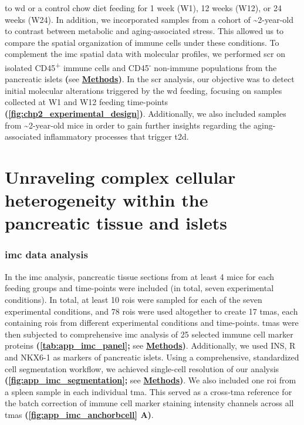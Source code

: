  to \gls{wd} or a control chow diet feeding for 1 week (W1), 12 weeks (W12), or 24 weeks (W24). In addition, we incorporated samples from a cohort of \textasciitilde2-year-old to contrast between metabolic and aging-associated stress. This allowed us to compare the spatial organization of immune cells under these conditions. To complement the \gls{imc} spatial data with molecular profiles, we performed \gls{scr} on isolated CD45\textsuperscript{+} immune cells and CD45\textsuperscript{-} non-immune populations from the pancreatic islets \textbf{(}see \hyperref[subsec:met_chp2_scrdata]{\textbf{Methods}}\textbf{)}. In the \gls{scr} analysis, our objective was to detect initial molecular alterations triggered by the \gls{wd} feeding, focusing on samples collected at W1 and W12 feeding time-points \textbf{(\autoref{fig:chp2_experimental_design})}. Additionally, we also included samples from \textasciitilde2-year-old mice in order to gain further insights regarding the aging-associated inflammatory processes that trigger \gls{t2d}.  %


\section[Unraveling complex cellular heterogeneity within the pancreatic tissue and islets]{Unraveling complex cellular heterogeneity within the\\pancreatic tissue and islets}
\label{sec:chp2_imc_scrna}

\subsubsection{\large \gls{imc} data analysis}
\label{sec_chp2_imc1}

In the \gls{imc} analysis, pancreatic tissue sections from at least 4 mice for each feeding groups and time-points were included (in total, seven experimental conditions). In total, at least 10 \glspl{roi} were sampled for each of the seven experimental conditions, and 78 \glspl{roi} were used altogether to create 17 \glspl{tma}, each containing \glspl{roi} from different experimental conditions and time-points. \glspl{tma} were then subjected to comprehensive \gls{imc} analysis of 25 selected immune cell marker proteins \textbf{(\autoref{tab:app_imc_panel};} see \hyperref[subsec:met_chp2_imcdata]{\textbf{Methods}}\textbf{)}. Additionally, we used INS, R and NKX6-1 as markers of pancreatic islets. Using a comprehensive, standardized cell segmentation workflow, we achieved single-cell resolution of our  analysis \textbf{(\autoref{fig:app_imc_segmentation};} see \hyperref[subsec:met_chp2_imcdata]{\textbf{Methods}}\textbf{)}. We also included one \gls{roi} from a spleen sample in each individual \gls{tma}. This served as a cross-\gls{tma} reference for the batch correction of immune cell marker staining intensity channels across all \glspl{tma} \textbf{(\autoref{fig:app_imc_anchorbcell} A)}.\\


